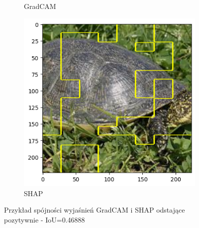 \begin{figure}[h]
\begin{subfigure}[b]{0.3\textwidth}
		\caption{GradCAM}  \label{}
	\end{subfigure}
	\begin{subfigure}[b]{0.3\textwidth}
		\centering\includegraphics[width=.9\textwidth]{img/examples/appendix/n01667778_32805_shap}
		\caption{SHAP}
	\end{subfigure}
	\caption{Przykład spójności wyjaśnień GradCAM i SHAP odstające pozytywnie - IoU=0.46888}
	\label{}
\end{figure}

